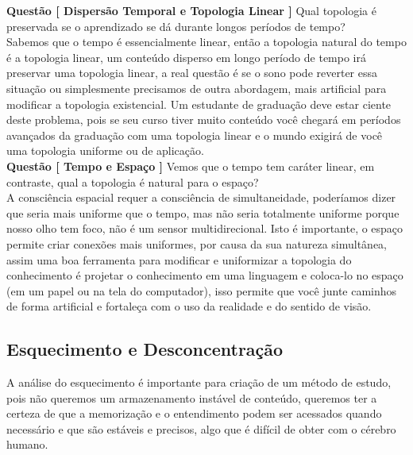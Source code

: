 \documentclass[10pt,a4paper]{report}
\begin{document}
\textbf{Questão [ Dispersão Temporal e Topologia Linear ]} Qual topologia é preservada se o aprendizado se dá durante longos períodos de tempo?\\

Sabemos que o tempo é essencialmente linear, então a topologia natural do tempo é a topologia linear, um conteúdo disperso em longo período de tempo irá preservar uma topologia linear, a real questão é se o sono pode reverter essa situação ou simplesmente precisamos de outra abordagem, mais artificial para modificar a topologia existencial. Um estudante de graduação deve estar ciente deste problema, pois se seu curso tiver muito conteúdo você chegará em períodos avançados da graduação com uma topologia linear e o mundo exigirá de você uma topologia uniforme ou de aplicação. \\

\textbf{Questão [ Tempo e Espaço ]} Vemos que o tempo tem caráter linear, em contraste, qual a topologia é natural para o espaço?\\

A consciência espacial requer a consciência de simultaneidade, poderíamos dizer que seria mais uniforme que o tempo, mas não seria totalmente uniforme porque nosso olho tem foco, não é um sensor multidirecional. Isto é importante, o espaço permite criar conexões mais uniformes, por causa da sua natureza simultânea, assim uma boa ferramenta para modificar e uniformizar a topologia do conhecimento é projetar o conhecimento em uma linguagem e coloca-lo no espaço (em um papel ou na tela do computador), isso permite que você junte caminhos de forma artificial e fortaleça com o uso da realidade e do sentido de visão.\\

\subsection{Esquecimento e Desconcentração}

% 
\hspace{\baselineskip}

A análise do esquecimento é importante para criação de um método de estudo, pois não queremos um armazenamento instável de conteúdo, queremos ter a certeza de que a memorização e o entendimento podem ser acessados quando necessário e que são estáveis e precisos, algo que é difícil de obter com o cérebro humano.\\
\end{document}
